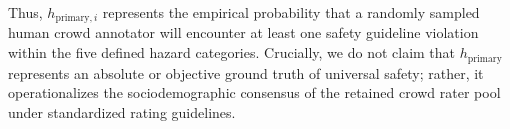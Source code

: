 Thus, $h_{\text{primary}, i}$ represents the empirical probability that a randomly sampled human crowd annotator will encounter at least one safety guideline violation within the five defined hazard categories. Crucially, we do not claim that $h_{\text{primary}}$ represents an absolute or objective ground truth of universal safety; rather, it operationalizes the sociodemographic consensus of the retained crowd rater pool under standardized rating guidelines.
